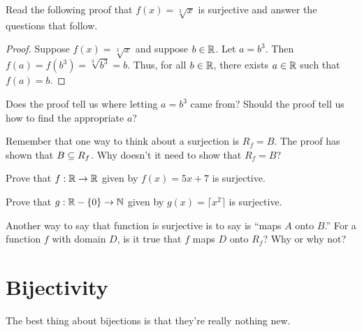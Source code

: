 \begin{question}[resume]
\item Read the following proof that $f(x)=\sqrt[3]{x}$ is surjective and answer the questions that follow.
	\begin{proof}
	Suppose $f(x) = \sqrt[3]{x}$ and suppose $b \in \mathbb{R}$.  Let $a=b^3$.  Then $f(a)=f(b^3)=\sqrt[3]{b^3}=b$.  Thus, for all $b \in \mathbb{R}$, there exists $a \in \mathbb{R}$ such that $f(a)=b$.
	\end{proof}
	\begin{qpart}
	\item Does the proof tell us where letting $a=b^3$ came from?  Should the proof tell us how to find the appropriate $a$?
	
	\vspace{1.5in}
	
	\item Remember that one way to think about a surjection is $R_f=B$.  The proof has shown that $B \subseteq R_f$.  Why doesn't it need to show that $R_f = B$?
	
	\vspace{2in}
	\end{qpart}
\newpage
\item Prove that $f: \mathbb{R} \to \mathbb{R}$ given by $f(x) = 5x+7$ is surjective.

\vspace{2.5in}  

\item Prove that $g: \mathbb{R}-\left\{0\right\} \to \mathbb{N}$ given by $g(x)=\lceil x^2 \rceil$ is surjective.

\vspace{2.5in}

\item Another way to say that function is surjective is to say is ``maps $A$ onto $B$.''  For a function $f$ with domain $D$, is it true that $f$ maps $D$ onto $R_f$?  Why or why not?

\vspace{2in}
\end{question}

\section{Bijectivity}

The best thing about bijections is that they're really nothing new.

